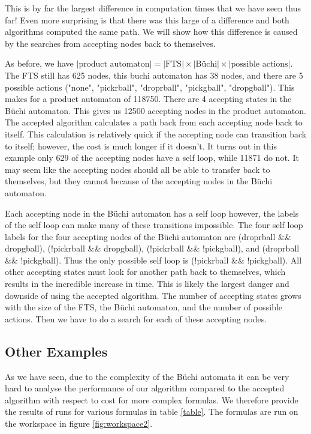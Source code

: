 This is by far the largest difference in computation times that we have seen thus far! Even more surprising is that there was this large of a difference and both algorithms computed the same path. We will show how this difference is caused by the searches from accepting nodes back to themselves.

As before, we have $|\text{product automaton}| =|\text{FTS}| \times |\text{B\"uchi}| \times |\text{possible actions}|$. The FTS still has 625 nodes, this buchi automaton has 38 nodes, and there are 5 possible actions ("none", "pickrball", "droprball", "pickgball", "dropgball"). This makes for a product automaton of 118750. There are 4 accepting states in the B\"uchi automaton. This gives us 12500 accepting nodes in the product automaton. The accepted algorithm calculates a path back from each accepting node back to itself. This calculation is relatively quick if the accepting node can transition back to itself; however, the cost is much longer if it doesn't. It turns out in this example only 629 of the accepting nodes have a self loop, while 11871 do not. It may seem like the accepting nodes should all be able to transfer back to themselves, but they cannot because of the accepting nodes in the B\"uchi automaton. 

Each accepting node in the B\"uchi automaton has a self loop however, the labels of the self loop can make many of these transitions impossible. The four self loop labels for the four accepting nodes of the B\"uchi automaton are (droprball \&\& dropgball), (!pickrball \&\& dropgball), (!pickrball \&\& !pickgball), and (droprball \&\& !pickgball). Thus the only possible self loop is (!pickrball \&\& !pickgball). All other accepting states must look for another path back to themselves, which results in the incredible increase in time. This is likely the largest danger and downside of using the accepted algorithm. The number of accepting states grows with the size of the FTS, the B\"uchi automaton, and the number of possible actions. Then we have to do a search for each of these accepting nodes.  



\subsection{Other Examples}
As we have seen, due to the complexity of the B\"uchi automata it can be very hard to analyse the performance of our algorithm compared to the accepted algorithm with respect to cost for more complex formulas. We therefore provide the results of runs for various formulas in table \ref{table}. The formulas are run on the workspace in figure \ref{fig:workspace2}. 

